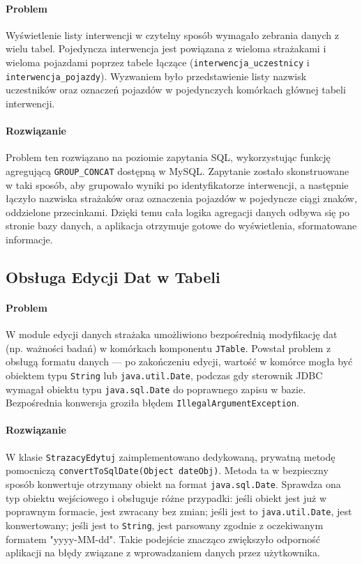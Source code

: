 \paragraph*{Problem} Wyświetlenie listy interwencji w czytelny sposób wymagało zebrania danych z wielu tabel. Pojedyncza interwencja jest powiązana z wieloma strażakami i wieloma pojazdami poprzez tabele łączące (\texttt{interwencja\_uczestnicy} i \texttt{interwencja\_pojazdy}). Wyzwaniem było przedstawienie listy nazwisk uczestników oraz oznaczeń pojazdów w pojedynczych komórkach głównej tabeli interwencji.

\paragraph*{Rozwiązanie} Problem ten rozwiązano na poziomie zapytania SQL, wykorzystując funkcję agregującą \texttt{GROUP\_CONCAT} dostępną w MySQL. Zapytanie zostało skonstruowane w taki sposób, aby grupowało wyniki po identyfikatorze interwencji, a następnie łączyło nazwiska strażaków oraz oznaczenia pojazdów w pojedyncze ciągi znaków, oddzielone przecinkami. Dzięki temu cała logika agregacji danych odbywa się po stronie bazy danych, a aplikacja otrzymuje gotowe do wyświetlenia, sformatowane informacje.

\subsection*{Obsługa Edycji Dat w Tabeli}
\label{ssec:problem_daty}

\paragraph*{Problem} W module edycji danych strażaka umożliwiono bezpośrednią modyfikację dat (np. ważności badań) w komórkach komponentu \texttt{JTable}. Powstał problem z obsługą formatu danych — po zakończeniu edycji, wartość w komórce mogła być obiektem typu \texttt{String} lub \texttt{java.util.Date}, podczas gdy sterownik JDBC wymagał obiektu typu \texttt{java.sql.Date} do poprawnego zapisu w bazie. Bezpośrednia konwersja groziła błędem \texttt{IllegalArgumentException}.

\paragraph*{Rozwiązanie} W klasie \texttt{StrazacyEdytuj} zaimplementowano dedykowaną, prywatną metodę pomocniczą \texttt{convertToSqlDate(Object dateObj)}. Metoda ta w bezpieczny sposób konwertuje otrzymany obiekt na format \texttt{java.sql.Date}. Sprawdza ona typ obiektu wejściowego i obsługuje różne przypadki: jeśli obiekt jest już w poprawnym formacie, jest zwracany bez zmian; jeśli jest to \texttt{java.util.Date}, jest konwertowany; jeśli jest to \texttt{String}, jest parsowany zgodnie z oczekiwanym formatem "yyyy-MM-dd". Takie podejście znacząco zwiększyło odporność aplikacji na błędy związane z wprowadzaniem danych przez użytkownika.

